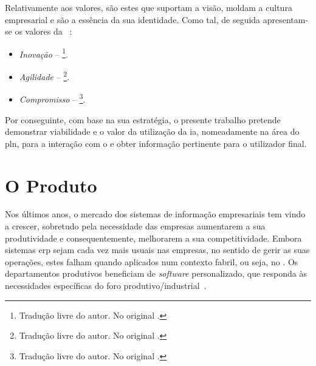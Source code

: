 Relativamente aos valores, são estes que suportam a visão, moldam a cultura empresarial e são a essência da sua identidade. Como tal, de seguida apresentam-se os valores da {\companyname}~\parencite{cmf_strategy}:

\begin{itemize}
    \item 
    {
        \textit{Inovação} -- \footnote{Tradução livre do autor. No original .}.
    }
    \item
    {
        \textit{Agilidade} -- \footnote{Tradução livre do autor. No original .}.
    }
    \item
    {
        \textit{Compromisso} -- \footnote{Tradução livre do autor. No original .}.
    }
\end{itemize}

Por conseguinte, com base na sua estratégia, o presente trabalho pretende demonstrar viabilidade e o valor da utilização da \gls{ia}, nomeadamente na área do \gls{pln}, para a interação com o {\productname} e obter informação pertinente para o utilizador final. 

\section{O Produto}
\label{sec:chap2_product}

Nos últimos anos, o mercado dos sistemas de informação empresariais tem vindo a crescer, sobretudo pela necessidade das empresas aumentarem a sua produtividade e consequentemente, melhorarem a sua competitividade. Embora sistemas \gls{erp} sejam cada vez mais usuais nas empresas, no sentido de gerir as suas operações, estes falham quando aplicados num contexto fabril, ou seja, no . Os departamentos produtivos beneficiam de \textit{software} personalizado, que responda às necessidades específicas do foro produtivo/industrial~\parencite{mes_literature_review}. 

